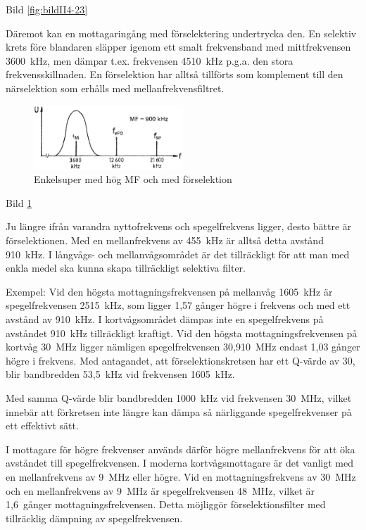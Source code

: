 Bild \ref{fig:bildII4-23}

Däremot kan en mottagaringång med förselektering undertrycka den. En
selektiv krets före blandaren släpper igenom ett smalt frekvensband
med mittfrekvensen 3600~kHz, men dämpar t.ex. frekvensen 4510~kHz
p.g.a. den stora frekvensskillnaden. En förselektion har alltså
tillförts som komplement till den närselektion som erhålls med
mellanfrekvensfiltret.

\begin{figure}
  \includegraphics[width=0.5\textwidth]{images/cropped_pdfs/bild_2_4-24.pdf}
  \caption{Enkelsuper med hög MF och med förselektion}
  \label{fig:bildII4-24}
\end{figure}

Bild \ref{fig:bildII4-24}

Ju längre ifrån varandra nyttofrekvens och spegelfrekvens ligger,
desto bättre är förselektionen. Med en mellanfrekvens av 455~kHz är
alltså detta avstånd 910~kHz. I långvågs- och mellanvågsområdet är det
tillräckligt för att man med enkla medel ska kunna skapa
tillräckligt selektiva filter.

Exempel: Vid den högsta mottagningsfrekvensen på mellanvåg 1605~kHz är
spegelfrekvensen 2515~kHz, som ligger 1,57 gånger högre i frekvens och
med ett avstånd av 910~kHz. I kortvågsområdet dämpas inte en
spegelfrekvens på avståndet 910~kHz tillräckligt kraftigt. Vid den
högsta mottagningsfrekvensen på kortvåg 30~MHz ligger nämligen
spegelfrekvensen 30,910~MHz endast 1,03 gånger högre i frekvens. Med
antagandet, att förselektionskretsen har ett Q-värde av 30, blir
bandbredden 53,5~kHz vid frekvensen 1605~kHz.

Med samma Q-värde blir bandbredden 1000~kHz vid frekvensen 30~MHz,
vilket innebär att förkretsen inte längre kan dämpa så närliggande
spegelfrekvenser på ett effektivt sätt.

I mottagare för högre frekvenser används därför högre mellanfrekvens
för att öka avståndet till spegelfrekvensen.
I moderna kortvågsmottagare är det vanligt med en mellanfrekvens av 9~MHz
eller högre.
Vid en mottagningsfrekvens av 30~MHz och en mellanfrekvens av 9~MHz är
spegelfrekvensen 48~MHz, vilket är 1,6~gånger mottagningsfrekvensen.
Detta möjliggör förselektionsfilter med tillräcklig dämpning av
spegelfrekvensen.


